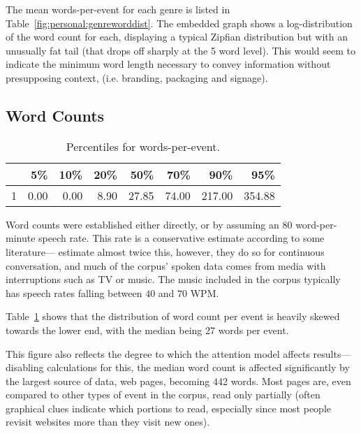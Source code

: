 The mean words-per-event for each genre is listed in Table~\ref{fig:personal:genreworddist}.  The embedded graph shows a log-distribution of the word count for each, displaying a typical Zipfian distribution but with an unusually fat tail (that drops off sharply at the 5 word level).  This would seem to indicate the minimum word length necessary to convey information without presupposing context, (i.e. branding, packaging and signage).





\subsection{Word Counts}

\begin{table}[ht]
    \centering

    \begin{tabular}{ | r | r | r | r | r | r | r | r | }
         \hline
         & 5\% & 10\% & 20\% & 50\% & 70\% & 90\% & 95\% \\ 
         \hline
         1 & 0.00 & 0.00 & 8.90 & 27.85 & 74.00 & 217.00 & 354.88 \\ 
         \hline
    \end{tabular}

    \caption{Percentiles for words-per-event.}
    \label{table:personal:wordsperevent}
\end{table}

Word counts were established either directly, or by assuming an 80 word-per-minute speech rate.  This rate is a conservative estimate according to some literature---\cite{yuan2006towards} estimate almost twice this, however, they do so for continuous conversation, and much of the corpus' spoken data comes from media with interruptions such as TV or music.  The music included in the corpus typically has speech rates falling between $40$ and $70$ WPM.  

Table~\ref{table:personal:wordsperevent} shows that the distribution of word count per event is heavily skewed towards the lower end, with the median being 27 words per event.

This figure also reflects the degree to which the attention model affects results---disabling calculations for this, the median word count is affected significantly by the largest source of data, web pages, becoming 442 words.  Most pages are, even compared to other types of event in the corpus, read only partially (often graphical clues indicate which portions to read, especially since most people revisit websites more than they visit new ones).


